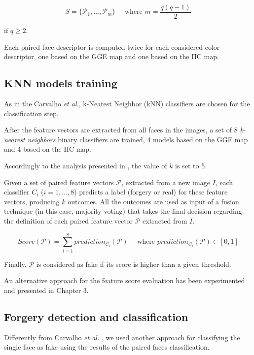$$
S = \{\mathcal{P}_1, \ldots, \mathcal{P}_m\} \quad \textrm{  where } m = \frac{q (q-1)}{2}
$$

if $q \geq 2$. 

Each paired face descriptor is computed twice for each considered color descriptor, one based on the GGE map and one based on the IIC map.

\subsection{KNN models training}

As in the Carvalho \emph{et al.}\cite{carvalho2016illuminant}, k-Nearest Neighbor (kNN) classifiers\cite{bishop2007pattern} are chosen for the classification step.

After the feature vectors are extracted from all faces in the images, a set of 8 \emph{k-nearest neighbors} binary classifiers are trained, 4 models based on the GGE map and 4 based on the IIC map. 

Accordingly to the analysis presented in \cite{carvalho2016illuminant}, the value of $k$ is set to 5.

Given a set of paired feature vectors $\mathcal{P}$, extracted from a new image $I$, each classifier $C_i$ ($i = 1, \ldots, 8$) predicts a label (forgery or real) for these feature vectors, producing $k$ outcomes. All the outcomes are used as input of a fusion technique (in this case, majority voting) that takes the final decision regarding the definition of each paired feature vector $\mathcal{P}$ extracted from $I$.

\begin{equation}\label{eq:faceknnscores}
Score(\mathcal{P}) = \sum_{i = 1}^{8} prediction_{C_i}(\mathcal{P}) \quad \textrm{ where } prediction_{C_i}(\mathcal{P}) \in [0, 1]
\end{equation}

Finally, $\mathcal{P}$ is considered as fake if its score is higher than a given threshold. 

An alternative approach for the feature score evaluation has been experimented and presented in Chapter 3.

\subsection{Forgery detection and classification}

Differently from Carvalho \emph{et al.} \cite{carvalho2016illuminant}, we used another approach for classifying the single face as fake using the results of the paired faces classification. 

